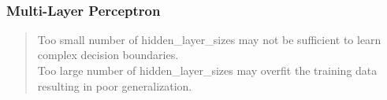 \documentclass[11pt]{article}
\begin{document}
    \begin{center}
    \end{center}
    { \hspace*{\fill} \\}
    
    \subsubsection{Multi-Layer Perceptron}\label{multi-layer-perceptron}

\begin{quote}
Too small number of hidden\_layer\_sizes may not be sufficient to learn
complex decision boundaries.\\
Too large number of hidden\_layer\_sizes may overfit the training data
resulting in poor generalization.
\end{quote}
\end{document}
